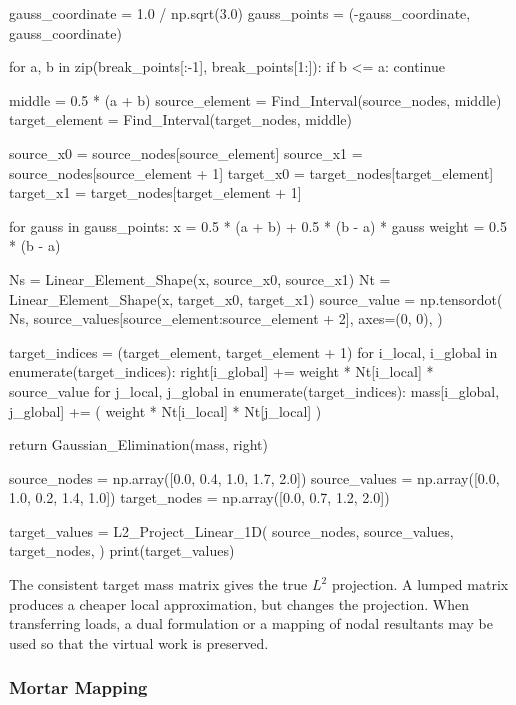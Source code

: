 \begin{python}
    gauss_coordinate = 1.0 / np.sqrt(3.0)
    gauss_points = (-gauss_coordinate, gauss_coordinate)

    for a, b in zip(break_points[:-1], break_points[1:]):
        if b <= a:
            continue

        middle = 0.5 * (a + b)
        source_element = Find_Interval(source_nodes, middle)
        target_element = Find_Interval(target_nodes, middle)

        source_x0 = source_nodes[source_element]
        source_x1 = source_nodes[source_element + 1]
        target_x0 = target_nodes[target_element]
        target_x1 = target_nodes[target_element + 1]

        for gauss in gauss_points:
            x = 0.5 * (a + b) + 0.5 * (b - a) * gauss
            weight = 0.5 * (b - a)

            Ns = Linear_Element_Shape(x, source_x0, source_x1)
            Nt = Linear_Element_Shape(x, target_x0, target_x1)
            source_value = np.tensordot(
                Ns,
                source_values[source_element:source_element + 2],
                axes=(0, 0),
            )

            target_indices = (target_element, target_element + 1)
            for i_local, i_global in enumerate(target_indices):
                right[i_global] += weight * Nt[i_local] * source_value
                for j_local, j_global in enumerate(target_indices):
                    mass[i_global, j_global] += (
                        weight * Nt[i_local] * Nt[j_local]
                    )

    return Gaussian_Elimination(mass, right)


source_nodes = np.array([0.0, 0.4, 1.0, 1.7, 2.0])
source_values = np.array([0.0, 1.0, 0.2, 1.4, 1.0])
target_nodes = np.array([0.0, 0.7, 1.2, 2.0])

target_values = L2_Project_Linear_1D(
    source_nodes,
    source_values,
    target_nodes,
)
print(target_values)
\end{python}

The consistent target mass matrix gives the true $ L^2 $ projection. A lumped
matrix produces a cheaper local approximation, but changes the projection.
When transferring loads, a dual formulation or a mapping of nodal resultants
may be used so that the virtual work is preserved.

\subsubsection{Mortar Mapping}

